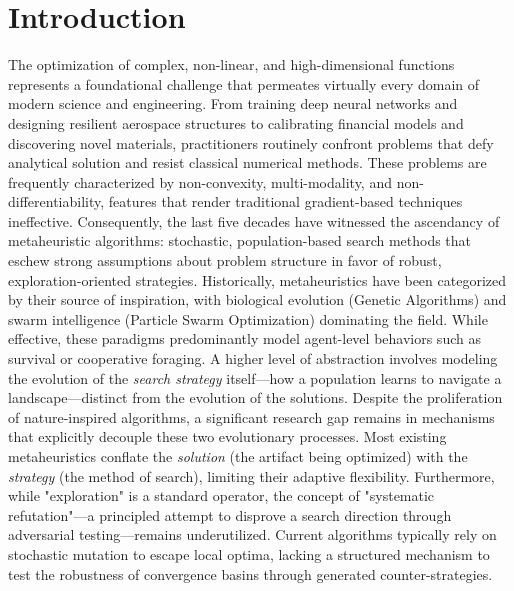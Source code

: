 \documentclass[11pt]{article}
\begin{document}
\section{Introduction}

The optimization of complex, non-linear, and high-dimensional functions represents a foundational challenge that permeates virtually every domain of modern science and engineering. From training deep neural networks and designing resilient aerospace structures to calibrating financial models and discovering novel materials, practitioners routinely confront problems that defy analytical solution and resist classical numerical methods. These problems are frequently characterized by non-convexity, multi-modality, and non-differentiability, features that render traditional gradient-based techniques ineffective. Consequently, the last five decades have witnessed the ascendancy of metaheuristic algorithms: stochastic, population-based search methods that eschew strong assumptions about problem structure in favor of robust, exploration-oriented strategies.
Historically, metaheuristics have been categorized by their source of inspiration, with biological evolution (Genetic Algorithms) and swarm intelligence (Particle Swarm Optimization) dominating the field. While effective, these paradigms predominantly model agent-level behaviors such as survival or cooperative foraging. A higher level of abstraction involves modeling the evolution of the \textit{search strategy} itself---how a population learns to navigate a landscape---distinct from the evolution of the solutions.
Despite the proliferation of nature-inspired algorithms, a significant research gap remains in mechanisms that explicitly decouple these two evolutionary processes. Most existing metaheuristics conflate the \textit{solution} (the artifact being optimized) with the \textit{strategy} (the method of search), limiting their adaptive flexibility. Furthermore, while "exploration" is a standard operator, the concept of "systematic refutation"---a principled attempt to disprove a search direction through adversarial testing---remains underutilized. Current algorithms typically rely on stochastic mutation to escape local optima, lacking a structured mechanism to test the robustness of convergence basins through generated counter-strategies.
\end{document}
